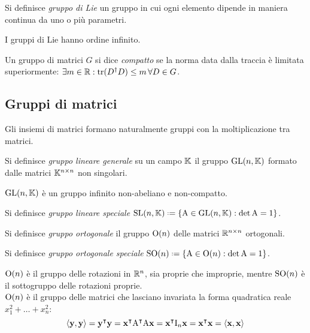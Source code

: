 \begin{definition}
	Si definisce \textit{gruppo di Lie} un gruppo in cui ogni elemento dipende in maniera continua da uno o più parametri.
\end{definition}
I gruppi di Lie hanno ordine infinito.

\begin{definition}\label{def-m-comp}
	Un gruppo di matrici $ G $ si dice \textit{compatto} se la norma data dalla traccia è limitata superiormente: $ \exists m \in \mathbb{R} : \operatorname{tr} ( D^{\dagger}D ) \le m \,\forall D \in G $.
\end{definition}

\subsection{Gruppi di matrici}

Gli insiemi di matrici formano naturalmente gruppi con la moltiplicazione tra matrici.

\begin{definition}
	Si definisce \textit{gruppo lineare generale} su un campo $ \mathbb{K} $ il gruppo $ \mathrm{GL}(n,\mathbb{K}) $ formato dalle matrici $ \mathbb{K}^{n \times n} $ non singolari.
\end{definition}

\begin{proposition}
	$ \mathrm{GL}(n,\mathbb{K}) $ è un gruppo infinito non-abeliano e non-compatto.
\end{proposition}

\begin{definition}
	Si definisce \textit{gruppo lineare speciale} $ \SL{n}{\K} \defeq \{ \tens{A} \in \GL{n}{\K} : \det \tens{A} = 1\} $.
\end{definition}

\begin{definition}
	Si definisce \textit{gruppo ortogonale} il gruppo $ \mathrm{O}(n) $ delle matrici $ \mathbb{R}^{n \times n} $ ortogonali.
\end{definition}

\begin{definition}
	Si definisce \textit{gruppo ortogonale speciale} $ \SOn{n} \defeq \{ \tens{A} \in \On{n} : \det \tens{A} = 1\} $.
\end{definition}

$ \mathrm{O}(n) $ è il gruppo delle rotazioni in $ \mathbb{R}^n $, sia proprie che improprie, mentre $ \mathrm{SO}(n) $ è il sottogruppo delle rotazioni proprie.\\
$ \mathrm{O}(n) $ è il gruppo delle matrici che lasciano invariata la forma quadratica reale $ x_1^2 + \dots + x_n^2 $:
\begin{equation*}
	\braket{\mathbf{y} , \mathbf{y}} = \mathbf{y}^{\intercal} \mathbf{y} = \mathbf{x}^{\intercal} \mathrm{A}^{\intercal} \mathrm{A} \mathbf{x} = \mathbf{x}^{\intercal} \mathrm{I}_n \mathbf{x} = \mathbf{x}^{\intercal} \mathbf{x} = \braket{\mathbf{x} , \mathbf{x}}
\end{equation*}

